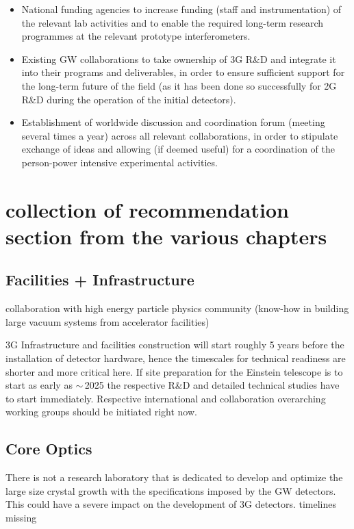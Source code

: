 
\begin{itemize}
\item National funding agencies to increase funding (staff and instrumentation) of the relevant lab activities and to enable the required long-term research programmes at the relevant prototype interferometers.
\item Existing GW collaborations to take ownership of 3G R\&D and integrate it into their programs and deliverables, in order to ensure sufficient support for the long-term future of the field (as it has been done so successfully for 2G R\&D during the operation of the initial detectors). 
\item Establishment of worldwide discussion and coordination forum (meeting several times a year) across all relevant collaborations, in order to stipulate exchange of ideas and allowing (if deemed useful) for a coordination of the person-power intensive experimental activities.
\end{itemize}

\section{collection of recommendation section from the various chapters}
\subsection{Facilities + Infrastructure}
collaboration with high energy particle physics community (know-how in building large vacuum
systems from accelerator facilities)

3G Infrastructure and facilities construction will start roughly 5 years before the installation of detector hardware, hence the timescales for technical readiness are shorter and more critical here.
If site preparation for the Einstein telescope is to start as early as $\sim$\,2025 the respective R\&D and detailed technical studies have to start immediately. Respective international and collaboration overarching working groups should be initiated right now.

\subsection{Core Optics}
There is not a research laboratory that is dedicated to develop and optimize the large size crystal growth with the specifications imposed by the GW detectors. This could have a severe impact on the development of 3G detectors.
timelines missing
